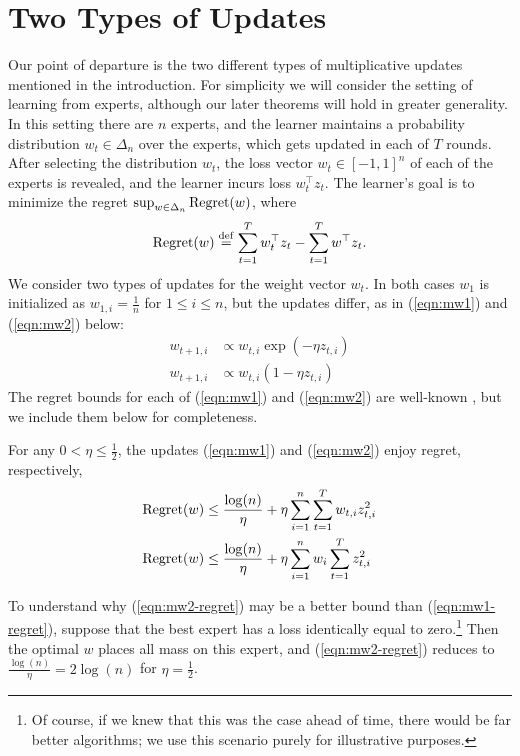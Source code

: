 \documentclass[paper_icml.tex]{subfiles}
\begin{document}
\section{Two Types of Updates} 
\label{sec:mw12}
Our point of departure is the two different types of multiplicative updates 
mentioned in the introduction. For simplicity we will consider the setting of 
learning from experts, although our later theorems will hold in greater 
generality. In this setting there are $n$ experts, and the learner maintains a 
probability distribution $w_t \in \Delta_n$ over the experts, which gets 
updated in each of $T$ rounds. After selecting the distribution $w_t$, 
the loss vector $w_t \in [-1,1]^n$ of each of the experts is revealed, and the 
learner incurs loss $w_t^{\top}z_t$. The learner's goal is to minimize 
the regret $\sup_{w \in \Delta_n} \operatorname{Regret}(w)$, where
\[ \operatorname{Regret}(w) \stackrel{\mathrm{def}}{=} \sum_{t=1}^T w_t^{\top}z_t - \sum_{t=1}^T w^{\top}z_t. \]
We consider two types of updates for the weight vector $w_t$. In both cases 
$w_1$ is initialized as $w_{1,i} = \frac{1}{n}$ for $1 \leq i \leq n$, but 
the updates differ, as in (\ref{eqn:mw1}) and (\ref{eqn:mw2}) below:
\begin{align}
\label{eqn:mw1}
w_{t+1,i} &\propto w_{t,i}\exp(-\eta z_{t,i})\\
\label{eqn:mw2}
w_{t+1,i} &\propto w_{t,i}(1-\eta z_{t,i})
\end{align}
The regret bounds for each of (\ref{eqn:mw1}) and (\ref{eqn:mw2}) are 
well-known \cite{people}, but we include them below for completeness.
\begin{theorem}
\label{thm:mw12}
For any $0 < \eta \leq \frac{1}{2}$, the updates (\ref{eqn:mw1}) and 
(\ref{eqn:mw2}) enjoy regret, respectively,
\begin{align}
\label{eqn:mw1-regret}
\operatorname{Regret}(w) &\leq \frac{\log(n)}{\eta} + \eta \sum_{i=1}^n \sum_{t=1}^T w_{t,i}z_{t,i}^2 \\
\label{eqn:mw2-regret}
\operatorname{Regret}(w) &\leq \frac{\log(n)}{\eta} + \eta \sum_{i=1}^n w_i \sum_{t=1}^T z_{t,i}^2
\end{align}
\end{theorem}
To understand why (\ref{eqn:mw2-regret}) may be a better bound than 
(\ref{eqn:mw1-regret}), suppose that the best expert has a loss identically 
equal to zero.\footnote{Of course, if we knew that this was the case ahead of 
time, there would be far better algorithms; we use this scenario purely for 
illustrative purposes.} Then the optimal $w$ places all mass on this expert, 
and (\ref{eqn:mw2-regret}) reduces to $\frac{\log(n)}{\eta} = 2\log(n)$ for 
$\eta = \frac{1}{2}$.
\end{document}
